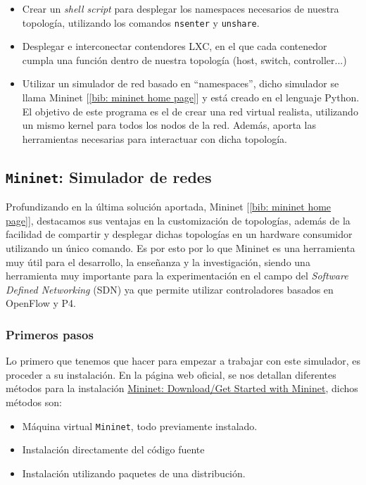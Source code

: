 \documentclass[12pt]{article}
\begin{document}
	\begin{itemize}
		\item Crear un \textit{shell script} para desplegar los namespaces necesarios de nuestra topología, utilizando los comandos \texttt{nsenter} y \texttt{unshare}.
		\item Desplegar e interconectar contendores LXC, en el que cada contenedor cumpla una función dentro de nuestra topología (host, switch, controller...)
		\item Utilizar un simulador de red basado en ``namespaces'', dicho simulador se llama Mininet [\ref{bib: mininet home page}] y está creado en el lenguaje Python. El objetivo de este programa es el de crear una red virtual realista, utilizando un mismo kernel para todos los nodos de la red. Además, aporta las herramientas necesarias para interactuar con dicha topología.
	\end{itemize}
	
	\vspace{10px}
	
	\subsection{\texttt{Mininet}: Simulador de redes}
	
	\noindent Profundizando en la última solución aportada, Mininet [\ref{bib: mininet home page}], destacamos sus ventajas en la customización de topologías, además de la facilidad de compartir y desplegar dichas topologías en un hardware consumidor utilizando un único comando. Es por esto por lo que Mininet es una herramienta muy útil para el desarrollo, la enseñanza y la investigación, siendo una herramienta muy importante para la experimentación en el campo del \textit{Software Defined Networking} (SDN) ya que permite utilizar controladores basados en OpenFlow y P4.
	
	\subsubsection{Primeros pasos}
	\noindent Lo primero que tenemos que hacer para empezar a trabajar con este simulador, es proceder a su instalación. En la página web oficial, se nos detallan diferentes métodos para la instalación \href{http://mininet.org/download/}{Mininet: Download/Get Started with Mininet}, dichos métodos son: 
	
	\begin{itemize}
		\item Máquina virtual \texttt{Mininet}, todo previamente instalado.
		\item Instalación directamente del código fuente
		\item Instalación utilizando paquetes de una distribución.
	\end{itemize}
\end{document}
